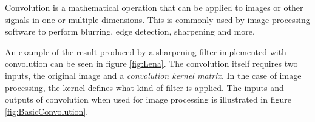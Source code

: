 Convolution is a mathematical operation that can be applied to images or other signals in one or multiple dimensions.
This is commonly used by image processing software to perform blurring, edge detection, sharpening and more.

An example of the result produced by a sharpening filter implemented with convolution can be seen in figure \ref{fig:Lena}.
The convolution itself requires two inputs, the original image and a \textit{convolution kernel matrix}.
In the case of image processing, the kernel defines what kind of filter is applied.
The inputs and outputs of convolution when used for image processing is illustrated in figure \ref{fig:BasicConvolution}.

